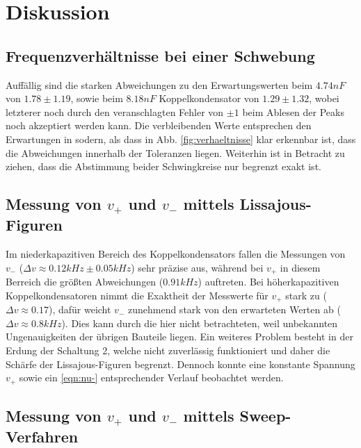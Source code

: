 \section{Diskussion}
\label{sec:Diskussion}

\subsection{Frequenzverhältnisse bei einer Schwebung}
\label{sec:Schwebung}

Auffällig sind die starken Abweichungen zu den Erwartungswerten beim $4.74nF$ von $1.78 \pm 1.19$, sowie beim $8.18nF$ Koppelkondensator von $1.29 \pm 1.32$, wobei letzterer noch durch den veranschlagten Fehler von $\pm 1$ beim Ablesen der Peaks noch akzeptiert werden kann. Die verbleibenden Werte entsprechen den Erwartungen in sodern, als dass in Abb. \ref{fig:verhaeltnisse} klar erkennbar ist, dass die Abweichungen innerhalb der Toleranzen liegen. Weiterhin ist in Betracht zu ziehen, dass die Abstimmung beider Schwingkreise nur begrenzt exakt ist.

\subsection{Messung von $v_+$ und $v_-$ mittels Lissajous-Figuren}
\label{sec:messung}

Im niederkapazitiven Bereich des Koppelkondensators fallen die Messungen von $v_-$ ($\Delta v \approx 0.12kHz \pm 0.05kHz$) sehr präzise aus, während bei $v_+$ in diesem Berreich die größten Abweichungen ($0.91kHz$) auftreten. Bei höherkapazitiven Koppelkondensatoren nimmt die Exaktheit der Messwerte für $v_+$ stark zu ($\Delta v \approx 0.17$), dafür weicht $v_-$ zunehmend stark von den erwarteten Werten ab ($\Delta v \approx 0.8kHz$). Dies kann durch die hier nicht betrachteten, weil unbekannten Ungenauigkeiten der übrigen Bauteile liegen. Ein weiteres Problem besteht in der Erdung der Schaltung 2, welche nicht zuverlässig funktioniert und daher die Schärfe der Lissajous-Figuren begrenzt. Dennoch konnte eine konstante Spannung $v_+$ sowie ein \eqref{eqn:nu-} entsprechender Verlauf beobachtet werden.

\subsection{Messung von $v_+$ und $v_-$ mittels Sweep-Verfahren}
\label{sec:sweep}

